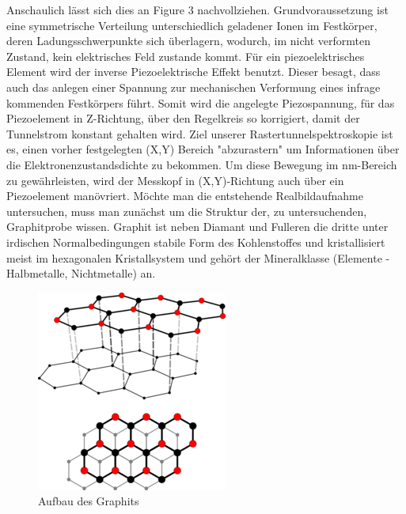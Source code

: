 \documentclass[10pt,a4paper]{article}
\begin{document}
Anschaulich lässt sich dies an Figure 3 nachvollziehen. Grundvoraussetzung ist eine symmetrische Verteilung unterschiedlich geladener Ionen im Festkörper, deren Ladungsschwerpunkte sich überlagern, wodurch, im nicht verformten Zustand, kein elektrisches Feld zustande kommt. Für ein piezoelektrisches Element wird der inverse Piezoelektrische Effekt benutzt. Dieser besagt, dass auch das anlegen einer Spannung zur mechanischen Verformung eines infrage kommenden Festkörpers führt. Somit wird die angelegte Piezospannung, für das Piezoelement in Z-Richtung, über den Regelkreis so korrigiert, damit der Tunnelstrom konstant gehalten wird. Ziel unserer Rastertunnelspektroskopie ist es, einen vorher festgelegten (X,Y) Bereich "abzurastern" um Informationen über die Elektronenzustandsdichte zu bekommen. Um diese Bewegung im nm-Bereich zu gewährleisten, wird der Messkopf in (X,Y)-Richtung auch über ein Piezoelement manövriert. Möchte man die entstehende Realbildaufnahme untersuchen, muss man zunächst um die Struktur der, zu untersuchenden, Graphitprobe wissen.
Graphit ist neben Diamant und Fulleren die dritte unter irdischen Normalbedingungen stabile Form des Kohlenstoffes und kristallisiert meist im hexagonalen Kristallsystem und gehört der Mineralklasse (Elemente - Halbmetalle, Nichtmetalle) an. 
\begin{figure}[h]
	\includegraphics[scale = 1.1]{Graphit.png}
	\centering
	\caption{Aufbau des Graphits}
	\label{diagramm_aufspaltung}
\end{figure}
\end{document}
